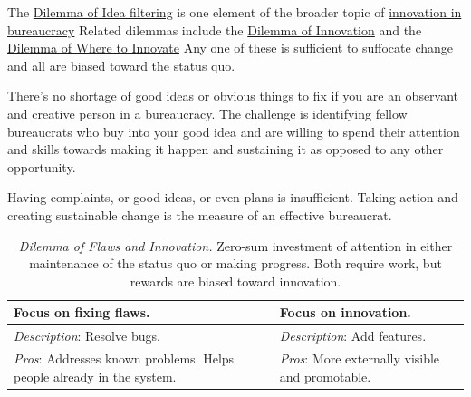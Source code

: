 The \hyperref[table:dilemma-personal-idea-filtering]{Dilemma of Idea filtering} 
\iftoggle{printedonpaper}{ (\ref{table:dilemma-personal-idea-filtering})}{}%
is one element of the broader topic of \hyperref[sec:innovation]{innovation in bureaucracy}%
\iftoggle{printedonpaper}{ (see page~\pageref{sec:innovation}).}{.} Related dilemmas include 
the \hyperref[table:dilemma-personal-disruptive-or-iterative]{Dilemma of Innovation} 
\iftoggle{printedonpaper}{ (\ref{table:dilemma-personal-disruptive-or-iterative})}{}%
and the \hyperref[table:dilemma-personal-where-to-innovate]{Dilemma of Where to Innovate}\iftoggle{printedonpaper}{ (\ref{table:dilemma-personal-where-to-innovate}).}{.} Any 
one of these is sufficient to suffocate change and all are biased toward the status quo.  

There's no shortage of good ideas or obvious things to fix if you are an observant and creative person in a bureaucracy.
The challenge is identifying fellow bureaucrats who buy into your good idea and are willing to spend their attention and skills towards making it happen and sustaining it as opposed to any other opportunity.

Having complaints, or good ideas, or even plans is insufficient. Taking action and creating sustainable change is the measure of an effective bureaucrat.



\begin{center}
\begin{table}[H] %
\begin{tabular}{ | m{\dilemmatablewidth}| m{\dilemmatablewidth} | } 
  \hline
  \textbf{Focus on fixing flaws.} &
  \textbf{Focus on innovation.} \\
  \hline
  \textit{Description}: Resolve bugs. &
  \textit{Description}: Add features. \\
  \hline
  \textit{Pros}: Addresses known problems. Helps people already in the system.  & 
  \textit{Pros}: More externally visible and promotable. \\
  \hline
\end{tabular}
\caption{
\textit{Dilemma of Flaws and Innovation.}
Zero-sum investment of attention in either maintenance of the status quo or making progress. Both require work, but rewards are biased toward innovation. 
}
\label{table:dilemma-personal-flaws-and-innovation}
\end{table}
\end{center}

